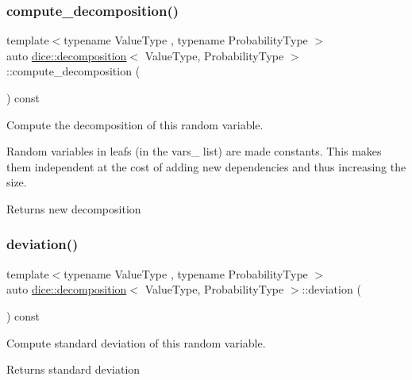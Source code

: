 \subsubsection{\texorpdfstring{compute\+\_\+decomposition()}{compute\_decomposition()}}
{\footnotesize\ttfamily template$<$typename Value\+Type , typename Probability\+Type $>$ \\
auto \mbox{\hyperlink{classdice_1_1decomposition}{dice\+::decomposition}}$<$ Value\+Type, Probability\+Type $>$\+::compute\+\_\+decomposition (\begin{DoxyParamCaption}{ }\end{DoxyParamCaption}) const\hspace{0.3cm}{\ttfamily [inline]}}



Compute the decomposition of this random variable. 

Random variables in leafs (in the vars\+\_\+ list) are made constants. This makes them independent at the cost of adding new dependencies and thus increasing the size.

\begin{DoxyReturn}{Returns}
new decomposition 
\end{DoxyReturn}
\mbox{\label{classdice_1_1decomposition_a0266f65d4898f049792543b3d52dda86}} 
\subsubsection{\texorpdfstring{deviation()}{deviation()}}
{\footnotesize\ttfamily template$<$typename Value\+Type , typename Probability\+Type $>$ \\
auto \mbox{\hyperlink{classdice_1_1decomposition}{dice\+::decomposition}}$<$ Value\+Type, Probability\+Type $>$\+::deviation (\begin{DoxyParamCaption}{ }\end{DoxyParamCaption}) const\hspace{0.3cm}{\ttfamily [inline]}}



Compute standard deviation of this random variable. 

\begin{DoxyReturn}{Returns}
standard deviation 
\end{DoxyReturn}
\mbox{\label{classdice_1_1decomposition_af8a3775b00001f174b9532434a0daad1}} 
